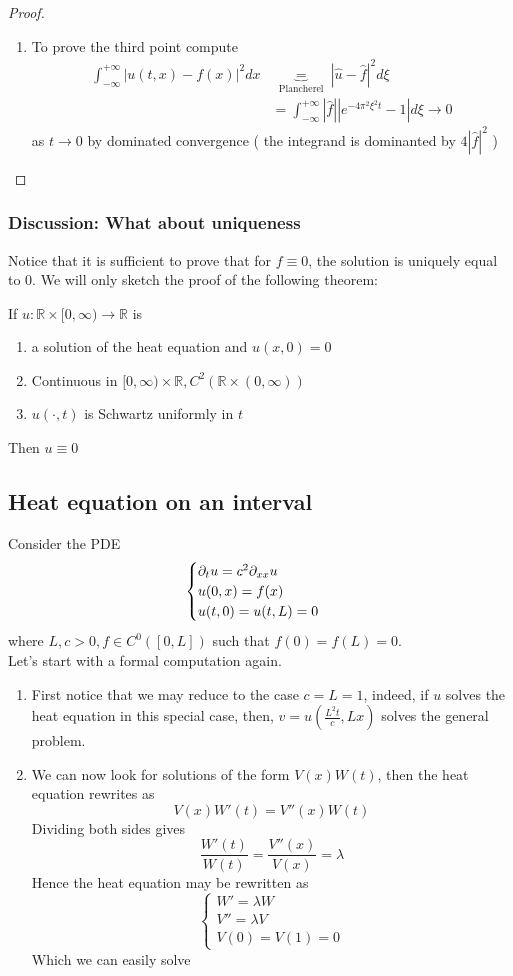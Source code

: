 \documentclass[../main.tex]{subfiles}
\begin{document}
\begin{proof}
\begin{enumerate}
	
\item To prove the third point compute
\begin{align*}
	\int_{-\infty}^{+\infty} | u( t,x) - f( x) |^{2}dx &\underbrace{=}_{ \text{ Plancherel } } | \hat{u}- \hat{f}| ^{2}d\xi\\
&= \int_{-\infty}^{+\infty} |\hat{f}| | e^{- 4 \pi^{2}\xi^{2}t} -1 | d\xi \to 0	
\end{align*}
as $t\to 0$ by dominated convergence ( the integrand is dominanted by $4 |\hat{f}|^{2}$ ) 

	\end{enumerate}


\end{proof}
\subsubsection{Discussion: What about uniqueness}
Notice that it is sufficient to prove that for $f \equiv 0$, the solution is uniquely equal to 0.
We will only sketch the proof of the following theorem:
\begin{thm}
	If $u: \mathbb{R}\times [ 0, \infty ) \to \mathbb{R} $ is
	\begin{enumerate}
	\item a solution of the heat equation and $u( x,0) = 0$ 
	\item Continuous in $ [ 0, \infty ) \times \mathbb{R}, C^{2}(  \mathbb{R}\times (   0, \infty ) )  $ 
	\item $u( \cdot, t) $ is Schwartz uniformly in $t$ 
	\end{enumerate}
	Then $u \equiv 0$ 
\end{thm}
\subsection{Heat equation on an interval}
Consider the PDE
\[ 
\begin{cases}
\partial_t u = c^{2} \partial_{xx} u\\
u( 0,x) = f( x) \\
u( t,0) = u( t,L) =0
\end{cases}
\]
where $L,c>0, f \in C^{0}( [ 0,L] ) $ such that $f( 0) = f( L) =0$.\\
Let's start with a formal computation again.
\begin{enumerate}
\item First notice that we may reduce to the case $c=L =1$, indeed, if $u$ solves the heat equation in this special case, then, $v= u( \frac{L^{2}t}{c}, Lx) $ solves the general problem.
\item We can now look for solutions of the form $V( x) W( t) $, then the heat equation rewrites as
	\[ 
	V( x) W' ( t) = V'' ( x) W( t) 
	\]
Dividing both sides gives
\[ 
\frac{W'( t) }{W( t) }= \frac{V''( x) }{V( x) }= \lambda
\]
Hence the heat equation may be rewritten as
\[ 
\begin{cases}
W' = \lambda W\\
V'' = \lambda V\\
V( 0) =V( 1) =0
\end{cases}
\]
Which we can easily solve

\end{enumerate}
\end{document}
